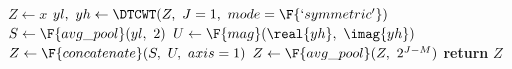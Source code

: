 \begin{algorithm}[tb]
  \label{alg:ch3:dtcwt_scat}
\begin{algorithmic}[1]
\State $Z \gets x$
  \State $yl,\ yh \gets \DTCWT(Z,\ J=1,\ mode=\F{`symmetric'})$
  \State $S \gets \F{avg\_pool}(yl,\ 2)$
  \State $U \gets \F{mag}(\real{yh},\ \imag{yh})$ 
  \State $Z \gets \F{concatenate}(S,\ U,\ axis=1)$ 
\EndFor
{}
\State $Z \gets \F{avg\_pool}(Z,\ 2^{J-M})$
\EndIf
\State \textbf{return} $Z$
\EndFunction
\end{algorithmic}
\end{algorithm}
